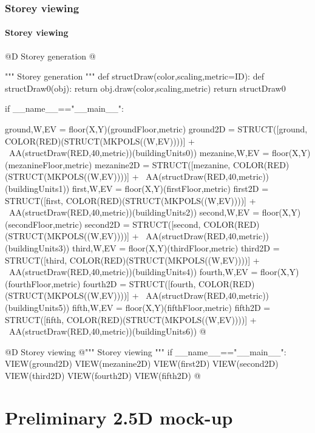 \documentclass[11pt,oneside]{article}    %
\begin{document}
\subsubsection{Storey viewing}

\paragraph{Storey viewing}
@D Storey generation
@{""" Storey generation """
def structDraw(color,scaling,metric=ID):
    def structDraw0(obj): return obj.draw(color,scaling,metric)
    return structDraw0

if __name__=="__main__":
    
    ground,W,EV = floor(X,Y)(groundFloor,metric)
    ground2D = STRUCT([ground, COLOR(RED)(STRUCT(MKPOLS((W,EV))))] + \
                AA(structDraw(RED,40,metric))(buildingUnits0))
    mezanine,W,EV = floor(X,Y)(mezanineFloor,metric)
    mezanine2D = STRUCT([mezanine, COLOR(RED)(STRUCT(MKPOLS((W,EV))))] + \
                AA(structDraw(RED,40,metric))(buildingUnits1))
    first,W,EV = floor(X,Y)(firstFloor,metric)
    first2D = STRUCT([first, COLOR(RED)(STRUCT(MKPOLS((W,EV))))] + \
                AA(structDraw(RED,40,metric))(buildingUnits2))
    second,W,EV = floor(X,Y)(secondFloor,metric)
    second2D = STRUCT([second, COLOR(RED)(STRUCT(MKPOLS((W,EV))))] + \
                AA(structDraw(RED,40,metric))(buildingUnits3))
    third,W,EV = floor(X,Y)(thirdFloor,metric)
    third2D = STRUCT([third, COLOR(RED)(STRUCT(MKPOLS((W,EV))))] + \
                AA(structDraw(RED,40,metric))(buildingUnits4))
    fourth,W,EV = floor(X,Y)(fourthFloor,metric)
    fourth2D = STRUCT([fourth, COLOR(RED)(STRUCT(MKPOLS((W,EV))))] + \
                AA(structDraw(RED,40,metric))(buildingUnits5))
    fifth,W,EV = floor(X,Y)(fifthFloor,metric)
    fifth2D = STRUCT([fifth, COLOR(RED)(STRUCT(MKPOLS((W,EV))))] + \
                AA(structDraw(RED,40,metric))(buildingUnits6))
@}

@D Storey viewing
@{""" Storey viewing """
if __name__=="__main__":
    VIEW(ground2D)
    VIEW(mezanine2D)
    VIEW(first2D)
    VIEW(second2D)
    VIEW(third2D)
    VIEW(fourth2D)
    VIEW(fifth2D)
@}


\section{Preliminary 2.5D mock-up}
\end{document}
